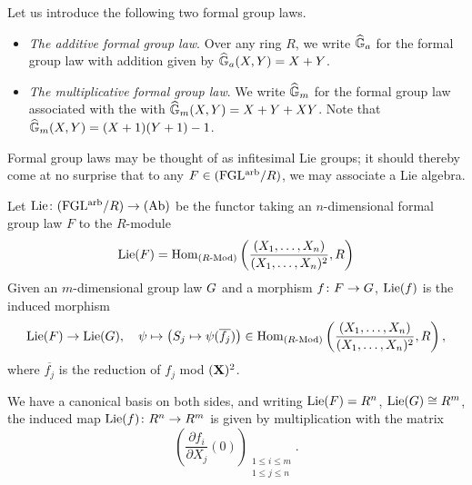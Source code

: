 \documentclass[../main.tex]{subfiles}
\begin{document}
\begin{xpl} Let us introduce the following two formal group laws.
  \begin{itemize}
    \item \textit{The additive formal group law}. Over any ring $R$, we write 
      $\widehat{\mathbb{G}}_a$ for the formal group law with addition given by 
      $\widehat{\mathbb{G}}_a(X,Y) = X + Y$. 
    \item \textit{The multiplicative formal group law}. We write $\widehat{\mathbb{G}}_m$ for
      the formal group law associated with the with $\widehat{\mathbb{G}}_m(X,Y) = X + Y +
      XY$. Note that $\widehat{\mathbb{G}}_m(X,Y) = (X+1)(Y+1) - 1$. 
  \end{itemize}
\end{xpl}

Formal group laws may be thought of as infitesimal Lie groups; it should
thereby come at no surprise that to
any $F \in {(\mathrm{FGL^{arb}}/{R})}$, we may associate a Lie algebra. 

\begin{defi}
Let $\operatorname{Lie}\colon {(\mathrm{FGL^{arb}}/{R})} \to {(\mathrm{Ab})}$ be the functor taking an $n$-dimensional 
formal group law $F$ to the $R$-module
\begin{equation*}
  \operatorname{Lie}({F}) = \operatorname{Hom}_{{({R}\textnormal-\allowbreak\mathrm{Mod})}} \left( \frac{(X_1, \dots, X_n)}{(X_1, \dots,
  X_n)^2}, R \right) 
\end{equation*}
Given an $m$-dimensional group law ${G}$ and a morphism ${f}\colon {F} \to
{G}$, $\operatorname{Lie}({f})$ is the induced morphism
\begin{equation*}
  \operatorname{Lie}({F}) \to \operatorname{Lie}({G}), \quad \psi \mapsto \left( S_j \mapsto \psi
  (\overline{f_j})\right) \in 
  \operatorname{Hom}_{({R}\textnormal-\allowbreak\mathrm{Mod})}\left(\frac{(X_1, \dots, X_n)}{(X_1, \dots, X_n)^2}, R \right),
\end{equation*}
where $\overline{ f_j}$ is the reduction of $f_j$ mod $(\mathbf{X})^2$. 
\end{defi}
We have a canonical basis on both sides, and writing $\operatorname{Lie}({F}) = R^n$, 
$\operatorname{Lie}({G}) \cong R^m$, the induced map $\operatorname{Lie}({f}) \colon R^n \to R^m$ is
given by multiplication with the matrix 
\begin{equation*}
  \left( \frac {\partial f_i}{\partial X_j} (0) \right)_{\substack{1 \leq i \leq m \\ 1 \leq j \leq n}}.
\end{equation*}
\end{document}
